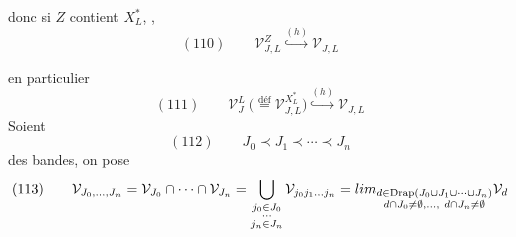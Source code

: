 \documentclass[11pt,a4paper]{article}
\begin{document}
donc si  $Z$ contient \struck{\ill{}} $X^{*}_L$, \ill{},
\[
(110)\qquad \mathcal V^Z_{J,L}\overset{(h)}{\hookrightarrow}\mathcal V_{J,L}
\]

en particulier
\[
(111)\qquad \mathcal V^L_J\ \Big(\overset{\text{déf}}{=}\mathcal V^{X^{*}_L}_{J,L}\Big)\overset{(h)}{\hookrightarrow}\mathcal V_{J,L}
\]
Soient
\[
(112)\qquad J_0\prec J_1\prec\cdots\prec J_n
\]
des bandes, on pose
\[
(113)\qquad \mathcal V_{J_0,\ldots,J_n}=\mathcal V_{J_0}\cap\cdots\cap\mathcal V_{J_n}
=\bigcup_{\substack{j_0\in J_0\\ \cdots\\ j_n\in J_n}}\mathcal V_{j_0 j_1\ldots j_n}
=\varinjlim_{\substack{d\in\mathrm{Drap}(J_0\cup J_1\cup\cdots\cup J_n)\\ d\cap J_0\ne\emptyset,\ldots,\ d\cap J_n\ne\emptyset}}\mathcal V_d
\]

\struck{\ill{}}
\end{document}
